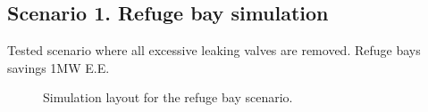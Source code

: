 	\subsection{Scenario 1. Refuge bay simulation}
	Tested scenario where all excessive leaking valves are removed.
	Refuge bays savings 1MW E.E.
	
	\begin{figure}[h]
		\centering
		\caption{Simulation layout for the refuge bay scenario.}
		\label{fig: Refuge bay layout}
	\end{figure}		
	
